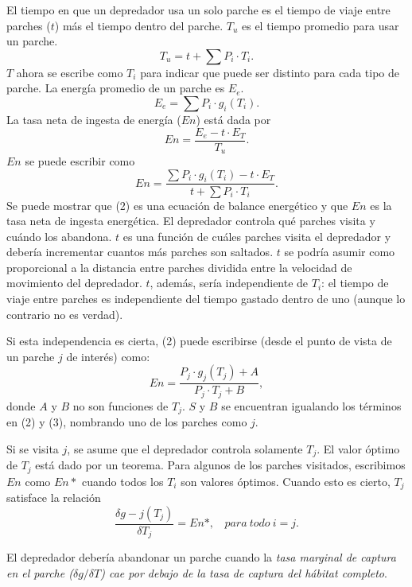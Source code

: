 \documentclass[a4paper,12pt]{article}
\begin{document}
El tiempo en que un depredador usa un solo parche es el tiempo de viaje entre parches ($t$) más el tiempo dentro del parche. $T_u$ es el tiempo promedio para usar un parche.
$$
T_u = t + \sum P_i \cdot T_i.
$$
$T$ ahora se escribe como $T_i$ para indicar que puede ser distinto para cada tipo de parche. La energía promedio de un parche es $E_e$.
$$
E_e=\sum P_i \cdot g_i(T_i).
$$
La tasa neta de ingesta de energía ($En$) está dada por 
\begin{equation}
En = \frac{
	E_e - t \cdot E_T
}{
	T_u
}.
\end{equation}
$En$ se puede escribir como 
\begin{equation}
En = \frac{
	\sum P_i \cdot g_i (T_i) - t \cdot E_T
}{
	t + \sum P_i \cdot T_i
}.
\end{equation}
Se puede mostrar que (2) es una ecuación de balance energético y que $En$ es la tasa neta de ingesta energética.
El depredador controla qué parches visita y cuándo los abandona. $t$ es una función de cuáles parches visita el depredador y debería incrementar cuantos más parches son saltados. $t$ se podría asumir como proporcional a la distancia entre parches dividida entre la velocidad de movimiento del depredador. $t$, además, sería independiente de $T_i$: el tiempo de viaje entre parches es independiente del tiempo gastado dentro de uno (aunque lo contrario no es verdad).

Si esta independencia es cierta, (2) puede escribirse (desde el punto de vista de un parche $j$ de interés) como:
\begin{equation}
	En = \frac{
		P_j \cdot g_j(T_j) + A
	}{
		P_j \cdot T_j + B
	},
\end{equation}
donde $A$ y $B$ no son funciones de $T_j$. $S$ y $B$ se encuentran igualando los términos en (2) y (3), nombrando uno de los parches como $j$.

Si se visita $j$, se asume que el depredador controla solamente $T_j$. El valor óptimo de $T_j$ está dado por un teorema. Para algunos de los parches visitados, escribimos $En$ como $En*$ cuando todos los $T_i$ son valores óptimos. Cuando esto es cierto, $T_j$ satisface la relación
\begin{equation}
	\frac{
		\delta g-j(T_j)
	}{
		\delta T_j
	}
	=
	En*,
	\ \ \ \ 
	para\ todo\ i=j.
\end{equation}

El depredador debería abandonar un parche cuando la {\itshape tasa marginal de captura en el parche ($\delta g/\delta T$) cae por debajo de la tasa de captura del hábitat completo}.
\end{document}
